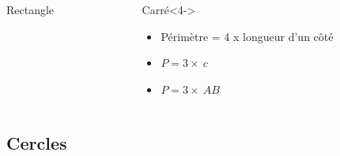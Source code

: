 \documentclass[xcolor=table]{beamer}
\begin{document}
\begin{frame}
\begin{columns}[onlytextwidth]
\begin{column}{0.35\textwidth}
\begin{alertblock}{Rectangle}
			\end{alertblock}
		\end{column}
		\begin{column}{0.25\textwidth}
			\begin{alertblock}{Carré}<4->
				\begin{itemize}
					\item Périmètre = 4 x longueur d'un côté
					\item $P = 3 \times\ c $
					\item $P = 3 \times\ AB $
				\end{itemize}
				
			\end{alertblock}
		\end{column}
	\end{columns}
\end{frame}

\subsection{Cercles}	
\end{document}

